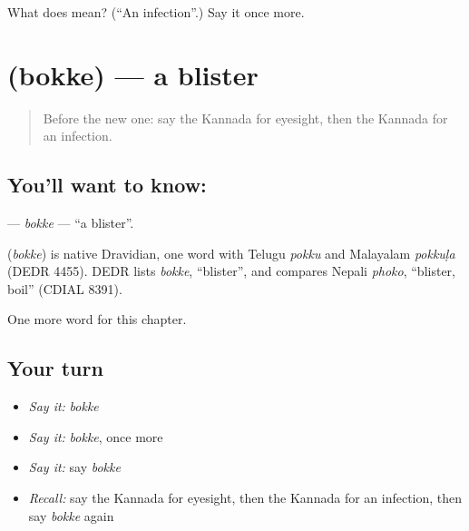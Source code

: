 \begin{tcolorbox}[breakable,colback=teal!4,colframe=teal!35!black,title={Before you move on}]
What does  mean? (\textquotedblleft{}An infection\textquotedblright{}.) Say it once more.
\end{tcolorbox}
\section[\texorpdfstring{\kn{ಬೊಕ್ಕೆ} (bokke)}{ಬೊಕ್ಕೆ (bokke)}]{ (bokke) — a blister}

\label{lesson:KA-C170-bokke}



\begin{quote}
Before the new one: say the Kannada for eyesight, then the Kannada for an infection.
\end{quote}

\subsection*{You'll want to know: }
\textbf{} — \emph{bokke} — \textquotedblleft{}a blister\textquotedblright{}.

\begin{cousinweb}
\textbf{} (\emph{bokke}) is native Dravidian, one word with Telugu \emph{pokku} and Malayalam \emph{pokkuḷa} (DEDR 4455). DEDR lists \emph{bokke}, \textquotedblleft{}blister\textquotedblright{}, and compares Nepali \emph{phoko}, \textquotedblleft{}blister, boil\textquotedblright{} (CDIAL 8391).
\end{cousinweb}

\begin{grammarlens}[title={What you've built}]
One more word for this chapter.
\end{grammarlens}

\subsection*{Your turn}
\begin{itemize}
\raggedright
  \item \emph{Say it:} \emph{bokke}
  \item \emph{Say it:} \emph{bokke}, once more
  \item \emph{Say it:} say \emph{bokke}
  \item \emph{Recall:} say the Kannada for eyesight, then the Kannada for an infection, then say \emph{bokke} again
\end{itemize}

